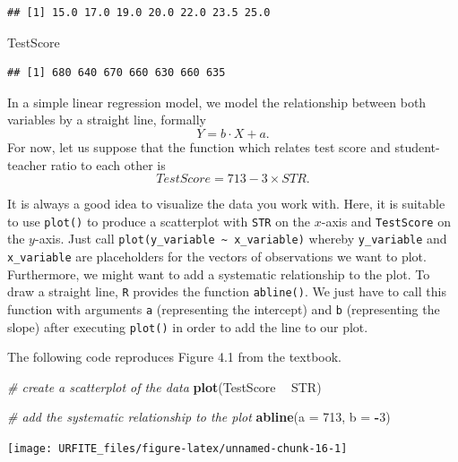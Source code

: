 \documentclass[]{book}
\newenvironment{Shaded}{\begin{snugshade}}{\end{snugshade}}
\newcommand{\KeywordTok}[1]{\textcolor[rgb]{0.13,0.29,0.53}{\textbf{#1}}}
\newcommand{\DataTypeTok}[1]{\textcolor[rgb]{0.13,0.29,0.53}{#1}}
\newcommand{\DecValTok}[1]{\textcolor[rgb]{0.00,0.00,0.81}{#1}}
\newcommand{\StringTok}[1]{\textcolor[rgb]{0.31,0.60,0.02}{#1}}
\newcommand{\CommentTok}[1]{\textcolor[rgb]{0.56,0.35,0.01}{\textit{#1}}}
\newcommand{\OperatorTok}[1]{\textcolor[rgb]{0.81,0.36,0.00}{\textbf{#1}}}
\newcommand{\NormalTok}[1]{#1}
\theoremstyle{definition}
\theoremstyle{definition}
\theoremstyle{definition}
\theoremstyle{remark}
\begin{document}
\begin{verbatim}
## [1] 15.0 17.0 19.0 20.0 22.0 23.5 25.0
\end{verbatim}

\begin{Shaded}
\begin{Highlighting}[]
\NormalTok{TestScore}
\end{Highlighting}
\end{Shaded}

\begin{verbatim}
## [1] 680 640 670 660 630 660 635
\end{verbatim}

In a simple linear regression model, we model the relationship between
both variables by a straight line, formally \[ Y = b \cdot X + a. \] For
now, let us suppose that the function which relates test score and
student-teacher ratio to each other is
\[TestScore = 713 - 3 \times STR.\]

It is always a good idea to visualize the data you work with. Here, it
is suitable to use \texttt{plot()} to produce a scatterplot with
\texttt{STR} on the \(x\)-axis and \texttt{TestScore} on the \(y\)-axis.
Just call \texttt{plot(y\_variable\ \textasciitilde{}\ x\_variable)}
whereby \texttt{y\_variable} and \texttt{x\_variable} are placeholders
for the vectors of observations we want to plot. Furthermore, we might
want to add a systematic relationship to the plot. To draw a straight
line, \texttt{R} provides the function \texttt{abline()}. We just have
to call this function with arguments \texttt{a} (representing the
intercept) and \texttt{b} (representing the slope) after executing
\texttt{plot()} in order to add the line to our plot.

The following code reproduces Figure 4.1 from the textbook.

\begin{Shaded}
\begin{Highlighting}[]
\CommentTok{# create a scatterplot of the data}
\KeywordTok{plot}\NormalTok{(TestScore }\OperatorTok{~}\StringTok{ }\NormalTok{STR)}

\CommentTok{# add the systematic relationship to the plot}
\KeywordTok{abline}\NormalTok{(}\DataTypeTok{a =} \DecValTok{713}\NormalTok{, }\DataTypeTok{b =} \OperatorTok{-}\DecValTok{3}\NormalTok{)}
\end{Highlighting}
\end{Shaded}

\begin{center}\texttt{[image: URFITE\_files/figure-latex/unnamed-chunk-16-1]} \end{center}
\end{document}

